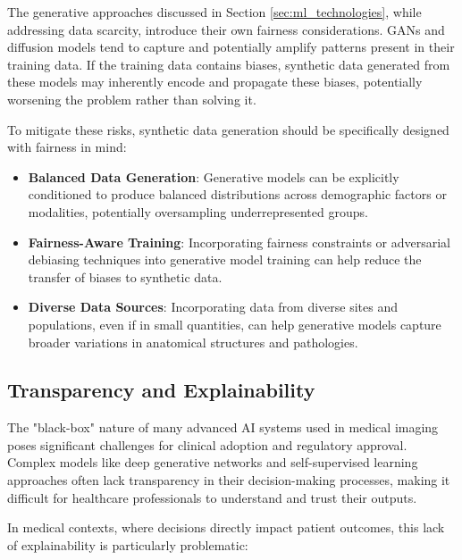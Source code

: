 \documentclass{article}
\begin{document}
The generative approaches discussed in Section \ref{sec:ml_technologies}, while addressing data scarcity, introduce their own fairness considerations. GANs and diffusion models tend to capture and potentially amplify patterns present in their training data. If the training data contains biases, synthetic data generated from these models may inherently encode and propagate these biases, potentially worsening the problem rather than solving it.

To mitigate these risks, synthetic data generation should be specifically designed with fairness in mind:

\begin{itemize}
    \item \textbf{Balanced Data Generation}: Generative models can be explicitly conditioned to produce balanced distributions across demographic factors or modalities, potentially oversampling underrepresented groups.
    
    \item \textbf{Fairness-Aware Training}: Incorporating fairness constraints or adversarial debiasing techniques into generative model training can help reduce the transfer of biases to synthetic data.
    
    \item \textbf{Diverse Data Sources}: Incorporating data from diverse sites and populations, even if in small quantities, can help generative models capture broader variations in anatomical structures and pathologies.
\end{itemize}


\subsection{Transparency and Explainability}
The "black-box" nature of many advanced AI systems used in medical imaging poses significant challenges for clinical adoption and regulatory approval. Complex models like deep generative networks and self-supervised learning approaches often lack transparency in their decision-making processes, making it difficult for healthcare professionals to understand and trust their outputs\cite{vermaRoleDeepLearning2023}.

In medical contexts, where decisions directly impact patient outcomes, this lack of explainability is particularly problematic:
\end{document}
